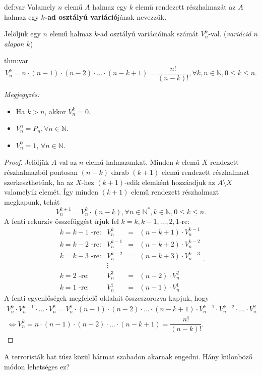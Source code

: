 \begin{definition}{def:var}
Valamely $n$ elemű $A$ halmaz egy $k$ elemű rendezett részhalmazát
az $A$ halmaz egy \textbf{$k$-ad osztályú variáció}jának nevezzük.
\end{definition}

Jelöljük egy $n$ elemű halmaz $k$-ad osztályú variációinak számát
$V_{n}^{k}$-val. (\textit{variáció $n$ alapon $k$})
\begin{theorem}{thm:var}
\[
V_{n}^{k}=n\cdot(n-1)\cdot(n-2)\cdot\ldots\cdot(n-k+1)=\frac{n!}{(n-k)!},\forall k,n\in\mathbb{N},0\leq k\leq n.
\]
\end{theorem}

\textit{Megjegyzés:} 
\begin{itemize}
\item Ha $k>n$, akkor $V_{n}^{k}=0$. 
\item $V_{n}^{n}=P_{n},\forall n\in\mathbb{N}$. 
\item $V_{n}^{0}=1$, $\forall n\in\mathbb{N}$. 
\end{itemize}
\begin{proof}
Jelöljük $A$-val az $n$ elemű halmazunkat. Minden $k$ elemű $X$
rendezett részhalmazból pontosan $(n-k)$ darab $(k+1)$ elemű rendezett
részhalmazt szerkeszthetünk, ha az $X$-hez $(k+1)$-edik elemként
hozzáadjuk az $A\setminus X$ valamelyik elemét. Így minden $(k+1)$
elemű rendezett részhalmazt megkapunk, tehát 
\[
V_{n}^{k+1}=V_{n}^{k}\cdot(n-k),\forall n\in\mathbb{N}^{*},k\in\mathbb{N},0\leq k\leq n.
\]
A fenti rekurzív összefüggést írjuk fel $k=k,k-1,\ldots,2,1$-re:
\[
\begin{array}{llcl}
k=k-1\text{ -re:} & V_{n}^{k} & = & (n-k+1)\cdot V_{n}^{k-1}\\
k=k-2\text{ -re:} & V_{n}^{k-1} & = & (n-k+2)\cdot V_{n}^{k-2}\\
k=k-3\text{ -re:} & V_{n}^{k-2} & = & (n-k+3)\cdot V_{n}^{k-3}\\
 & \vdots\\
k=2\text{ -re:} & V_{n}^{3} & = & (n-2)\cdot V_{n}^{2}\\
k=1\text{ -re:} & V_{n}^{1} & = & (n-1)\cdot V_{n}^{1}
\end{array}.
\]
A fenti egyenlőségek megfelelő oldalait összeszorozva kapjuk, hogy
\[
\begin{array}{c}
V_{n}^{k}\cdot V_{n}^{k-1}\cdot\ldots\cdot V_{n}^{2}=V_{n}^{1}\cdot(n-1)\cdot(n-2)\cdot\ldots\cdot(n-k+1)\cdot V_{n}^{k-1}\cdot V_{n}^{k-2}\cdot\ldots\cdot V_{n}^{2}\\
\Leftrightarrow V_{n}^{k}=n\cdot(n-1)\cdot(n-2)\cdot\ldots\cdot(n-k+1)=\dfrac{n!}{(n-k)!}.
\end{array}
\]
\end{proof}
\begin{problem}
\label{fel6} A terroristák hat túsz közül hármat szabadon akarnak
engedni. Hány különböző módon lehetséges ez? 
\end{problem}

